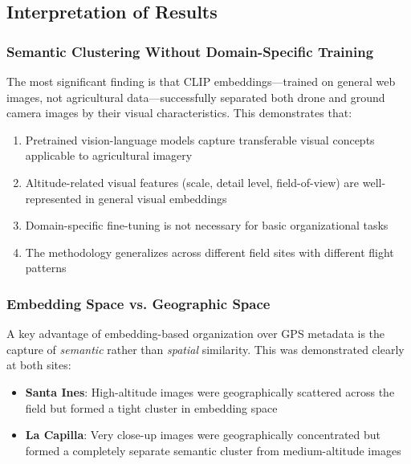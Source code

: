 
\subsection{Interpretation of Results}

\subsubsection{Semantic Clustering Without Domain-Specific Training}

The most significant finding is that CLIP embeddings---trained on general web images, not agricultural data---successfully separated both drone and ground camera images by their visual characteristics. This demonstrates that:

\begin{enumerate}
    \item Pretrained vision-language models capture transferable visual concepts applicable to agricultural imagery
    \item Altitude-related visual features (scale, detail level, field-of-view) are well-represented in general visual embeddings
    \item Domain-specific fine-tuning is not necessary for basic organizational tasks
    \item The methodology generalizes across different field sites with different flight patterns
\end{enumerate}


\subsubsection{Embedding Space vs. Geographic Space}

A key advantage of embedding-based organization over GPS metadata is the capture of \emph{semantic} rather than \emph{spatial} similarity. This was demonstrated clearly at both sites:

\begin{itemize}
    \item \textbf{Santa Ines}: High-altitude images were geographically scattered across the field but formed a tight cluster in embedding space
    \item \textbf{La Capilla}: Very close-up images were geographically concentrated but formed a completely separate semantic cluster from medium-altitude images
\end{itemize}

